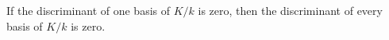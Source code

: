 If the discriminant of one basis of $K/k$ is zero, then the discriminant of every basis of $K/k$ is zero.
